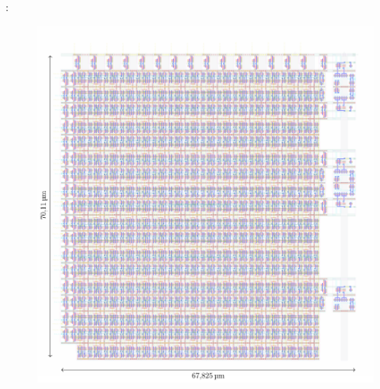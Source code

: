 \documentclass[aspectratio=169]{beamer}
\begin{document}
\begin{frame}{\secname: \subsecname}
	\begin{figure}[!h]
  		\centering
        	\includegraphics[scale=0.45]{slike/prezentacija/layout_dco5_hl_lh_130.pdf}
    	\end{figure}		
\end{frame}
\end{document}
